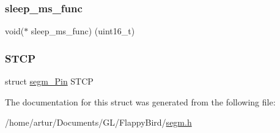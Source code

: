 \mbox{\label{structsegm___display_a1e5ae2ed36ddc0e39cf9af76158e3a19}} 
\subsubsection{\texorpdfstring{sleep\+\_\+ms\+\_\+func}{sleep\_ms\_func}}
{\footnotesize\ttfamily void($\ast$ sleep\+\_\+ms\+\_\+func) (uint16\+\_\+t)}

\mbox{\label{structsegm___display_a1c10ce4082cdb688e731a1fd5246edd8}} 
\subsubsection{\texorpdfstring{S\+T\+CP}{STCP}}
{\footnotesize\ttfamily struct \mbox{\hyperlink{structsegm___pin}{segm\+\_\+\+Pin}} S\+T\+CP}



The documentation for this struct was generated from the following file\+:\begin{DoxyCompactItemize}
\item 
/home/artur/\+Documents/\+G\+L/\+Flappy\+Bird/\mbox{\hyperlink{segm_8h}{segm.\+h}}\end{DoxyCompactItemize}
